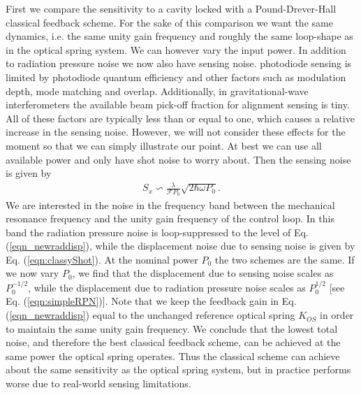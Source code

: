 First we compare the sensitivity to a cavity locked with a Pound-Drever-Hall classical feedback scheme. For the sake of this comparison we want the same dynamics, i.e. the same unity gain frequency and roughly the same loop-shape as in the optical spring system. We can however vary the input power. In addition to radiation pressure noise
we now also have sensing noise.
photodiode sensing is limited by photodiode quantum efficiency and other factors such as modulation depth, mode matching and overlap. Additionally, in gravitational-wave interferometers the available beam pick-off fraction for alignment sensing is tiny.
All of these factors are typically less than or equal to one, which causes a relative increase in the sensing noise. However, we will not consider these effects for the moment so that we can simply illustrate our point. At best we can use all available power and only have shot noise to worry about. Then the sensing noise is given by
\begin{align}
\label{eqn:classyShot}
S_x \backsim \frac{\lambda}{\mathcal{F} P_0}\sqrt{2 \hbar \omega P_0}.
\end{align}
We are interested in the noise in the frequency band between the mechanical resonance frequency and the unity gain frequency of the control loop. In this band the radiation pressure noise is loop-suppressed to the level of Eq. (\ref{eqn_newraddisp}), while the displacement noise due to sensing noise is given by Eq. (\ref{eqn:classyShot}). At the nominal power $P_0$ the two schemes are the same. If we now vary $P_0$, we find that the displacement due to sensing noise scales as $P_0^{-1/2}$, while the displacement due to radiation pressure noise scales as $P_0^{1/2}$ [see Eq. (\ref{eqn:simpleRPN})]. Note that we keep the feedback gain in Eq. (\ref{eqn_newraddisp}) equal to the unchanged reference optical spring $K_{OS}$ in order to maintain the same unity gain frequency. We conclude that the lowest total noise, and therefore the best classical feedback scheme, can be achieved at the same power the optical spring operates. Thus the classical scheme can achieve about the same sensitivity as the optical spring system, but in practice performs worse due to real-world sensing limitations.


